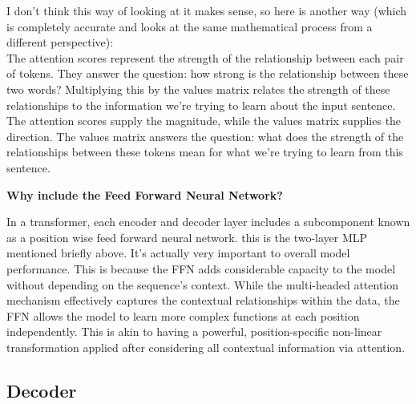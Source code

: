 \documentclass[12pt]{article}
\begin{document}
I don't think this way of looking at it makes sense, so here is another way (which is completely accurate and looks at the same mathematical process from a different perspective): \\

The attention scores represent the strength of the relationship between each pair of tokens. They answer the question: how strong is the relationship between these two words? Multiplying this by the values matrix relates the strength of these relationships to the information we're trying to learn about the input sentence. The attention scores supply the magnitude, while the values matrix supplies the direction. The values matrix answers the question: what does the strength of the relationships between these tokens mean for what we're trying to learn from this sentence.

\textbf {Why include the Feed Forward Neural Network?}

In a transformer, each encoder and decoder layer includes a subcomponent known as a position wise feed forward neural network. this is the two-layer MLP mentioned briefly above. It's actually very important to overall model performance. This is because the FFN adds considerable capacity to the model without depending on the sequence's context. While the multi-headed attention mechanism effectively captures the contextual relationships within the data, the FFN allows the model to learn more complex functions at each position independently. This is akin to having a powerful, position-specific non-linear transformation applied after considering all contextual information via attention.

\subsection{Decoder}
\end{document}

